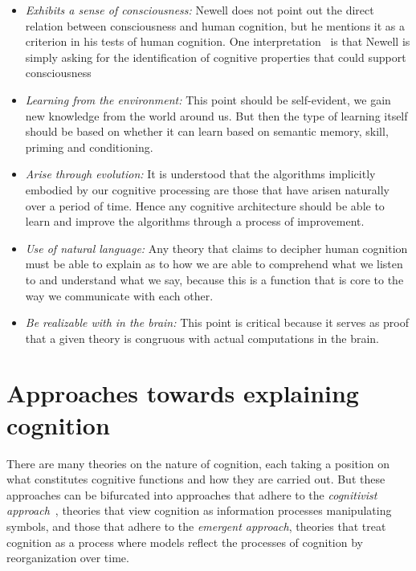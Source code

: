\begin{itemize}
\item {\em Exhibits a sense of consciousness:} Newell does not point
  out the direct relation between consciousness and human cognition,
  but he mentions it as a criterion in his tests of human
  cognition. One interpretation~\cite{CambridgeJournals:207162} is
  that Newell is simply asking for the identification of cognitive
  properties that could support consciousness~\cite{Cohen:1996aa}

\item {\em Learning from the environment:} This point should be
  self-evident, we gain new knowledge from the world around us. But
  then the type of learning itself should be based on whether it can
  learn based on semantic memory, skill, priming and conditioning.

\item {\em Arise through evolution:} It is understood that the
  algorithms implicitly embodied by our cognitive processing are those
  that have arisen naturally over a period of time.  Hence any
  cognitive architecture should be able to learn and improve the
  algorithms through a process of improvement.

\item {\em Use of natural language:} Any theory that claims to
  decipher human cognition must be able to explain as to how we are
  able to comprehend what we listen to and understand what we say,
  because this is a function that is core to the way we communicate
  with each other.

\item {\em Be realizable with in the brain:} This point is critical
  because it serves as proof that a given theory is congruous with
  actual computations in the brain.

\end{itemize}

\section{Approaches towards explaining cognition}
There are many theories on the nature of cognition, each taking a
position on what constitutes cognitive functions and how they are
carried out. But these approaches can be bifurcated into approaches
that adhere to the \emph{cognitivist
  approach}~\cite{DBLP:journals/tec/VernonMS07}, theories that view
cognition as information processes manipulating symbols, and those
that adhere to the \emph{emergent approach}, theories that treat
cognition as a process where models reflect the processes of cognition
by reorganization over time.

